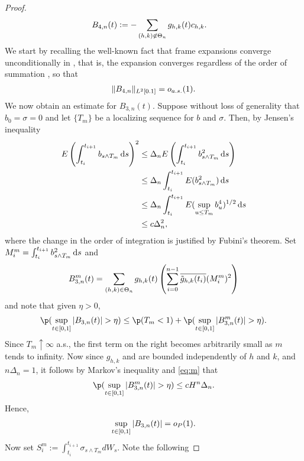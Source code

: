 \begin{proof}
\begin{align}
  &B_{4,n}(t) := - \sum_{\substack{(h,k) \not\in \Theta_n }}g_{h,k}(t){c}_{h,k}. 
  \label{}
\end{align}
We start by recalling the well-known fact that  frame expansions converge unconditionally in \Ltwo, that is, the expansion converges regardless of the order of summation \citep[Theorem 5.1.7]{Christensen2008}, so that  
\begin{align}
  \Vert B_{4, n}  \Vert_{L^2[0.1]} = o_{a.s.}(1).\notag
  \label{}
\end{align}
We now obtain an estimate for  $B_{3,n}(t)$. Suppose without loss of generality that $b_0 = \sigma =  0$ and let $\{T_m\}$ be a localizing sequence for $b$ and $\sigma$.  Then, by Jensen's inequality
\begin{align}
 E\left(\int_{t_i}^{t_{i+1}} b_{s \wedge T_m}  \D s\right)^2  &\le \Delta_n E\left(\int_{t_i}^{t_{i+1}} b_{s \wedge T_m}^2  \D s\right) \notag \\
&\le \Delta_n \int_{t_i}^{t_{i+1}} E(b_{s \wedge T_m}^2)  \D s \notag\\
&\le \Delta_n \int_{t_i}^{t_{i+1}} E(\sup_{u \le T_m}b_{u}^4)^{1/2}  \D s \notag\\
& \le c \Delta_n^2,
  \label{eq:m}
\end{align}
where the change in the order of integration is justified by Fubini's theorem.  Set $M_i^m = \int_{t_i}^{t_{i+1}} b_{s \wedge T_m}^2  \D s$ and 
\begin{align}
  B^m_{3,n}(t) = \sum_{(h,k) \in \Theta_n} g_{h,k}(t)\left( \sum_{i=0}^{n-1} \overline{\tilde{g}_{h,k}(t_i)} (M_i^m)^2 \right)\notag
  \label{}
\end{align}
and note that given $\eta > 0$,
\begin{align}
 \p(\sup_{t \in \domain} \vert B_{3,n}(t)\vert >  \eta ) \le \p(T_m < 1) + \p( \sup_{t \in \domain} \vert B_{3,n}^m(t)\vert > \eta). \notag
  \label{}
\end{align}
Since $T_m \uparrow \infty$ a.s., the first term on the right becomes arbitrarily small as $m$ tends to infinity. Now since  $g_{h,k}$ and \tghk  are bounded independently of $h$ and $k$, and $n\Delta_n = 1$, it follows by Markov's inequality and \eqref{eq:m} that 
\begin{align}
  \p( \sup_{t \in \domain} \vert B_{3,n}^m(t)\vert > \eta) \le  c H^n \Delta_n.  \notag
  \label{}
\end{align}
Hence,
\begin{align}
  \sup_{t \in [0,1]} \vert B_{3,n}(t)\vert = o_{P}( 1).
  \label{}
\end{align}
Now set $S_i^m := \int_{t_i}^{t_{i + 1}} \sigma_{s \wedge T_m} d W_s$. Note the following  

\end{proof}
